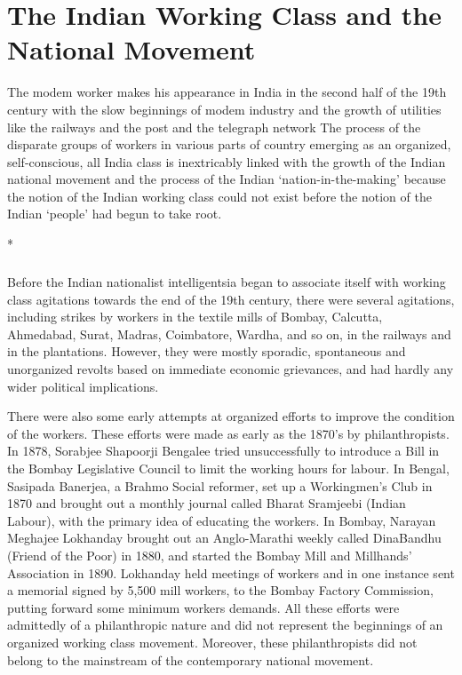 \chapter[The Indian Working Class and National Movement]{The Indian Working Class and the National Movement}
\begin{multicols}{2}

The modem worker makes his appearance in India in the second half of the 19th century with the slow beginnings of modem industry and the growth of utilities like the railways and the post and the telegraph network The process of the disparate groups of workers in various parts of country emerging as an organized, self-conscious, all India class is inextricably linked with the growth of the Indian national movement and the process of the Indian `nation-in-the-making' because the notion of the Indian working class could not exist before the notion of the Indian `people' had begun to take root.

\begin{center}*\end{center}

\paragraph*{}
Before the Indian nationalist intelligentsia began to associate itself with working class agitations towards the end of the 19th century, there were several agitations, including strikes by workers in the textile mills of Bombay, Calcutta, Ahmedabad, Surat, Madras, Coimbatore, Wardha, and so on, in the railways and in the plantations. However, they were mostly sporadic, spontaneous and unorganized revolts based on immediate economic grievances, and had hardly any wider political implications.

There were also some early attempts at organized efforts to improve the condition of the workers. These efforts were made as early as the 1870's by philanthropists. In 1878, Sorabjee Shapoorji Bengalee tried unsuccessfully to introduce a Bill in the Bombay Legislative Council to limit the working hours for labour. In Bengal, Sasipada Banerjea, a Brahmo Social reformer, set up a Workingmen's Club in 1870 and brought out a monthly journal called Bharat Sramjeebi (Indian Labour), with the primary idea of educating the workers. In Bombay, Narayan Meghajee Lokhanday brought out an Anglo-Marathi weekly called DinaBandhu (Friend of the Poor) in 1880, and started the Bombay Mill and Millhands' Association in 1890. Lokhanday held meetings of workers and in one instance sent a memorial signed by 5,500 mill workers, to the Bombay Factory Commission, putting forward some minimum workers demands. All these efforts were admittedly of a philanthropic nature and did not represent the beginnings of an organized working class movement. Moreover, these philanthropists did not belong to the mainstream of the contemporary national movement.


\end{multicols}
